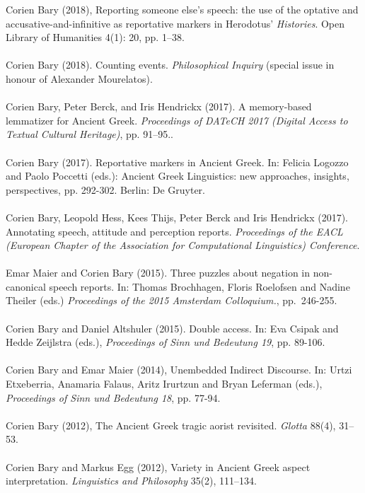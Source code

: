 \documentclass[a4paper,11pt]{article}
\begin{document}
Corien Bary (2018), Reporting someone else's speech: the use of the optative and accusative-and-infinitive as reportative markers in Herodotus' \emph{Histories}. Open Library of Humanities 4(1): 20, pp. 1--38.\\\\
Corien Bary (2018). Counting events. \emph{Philosophical Inquiry} (special issue in honour of Alexander Mourelatos).\\\\
Corien Bary, Peter Berck, and Iris Hendrickx (2017). A memory-based lemmatizer for Ancient Greek. \emph{Proceedings of DATeCH 2017 (Digital Access to Textual Cultural Heritage)}, pp. 91--95..\\\\
Corien Bary (2017). Reportative markers in Ancient Greek. In: Felicia Logozzo and Paolo Poccetti (eds.): Ancient Greek Linguistics: new approaches, insights, perspectives, pp. 292-302. Berlin: De Gruyter.\\\\
Corien Bary, Leopold Hess, Kees Thijs, Peter Berck and Iris Hendrickx (2017). Annotating speech, attitude and perception reports. \emph{Proceedings of the EACL  (European Chapter of the Association for Computational Linguistics) Conference}.\\\\
Emar Maier and Corien Bary (2015). Three puzzles about negation in non-canonical speech reports. In: Thomas Brochhagen, Floris Roelofsen and Nadine Theiler (eds.) \emph{Proceedings of the 2015 Amsterdam Colloquium.}, pp.\ 246-255.\\\\
Corien Bary and Daniel Altshuler (2015). Double access. In: Eva Csipak and Hedde Zeijlstra (eds.), \emph{Proceedings of Sinn und Bedeutung 19}, pp. 89-106.\\\\
Corien Bary and Emar Maier (2014), Unembedded Indirect Discourse. In: Urtzi Etxeberria, Anamaria Falaus, Aritz Irurtzun and Bryan Leferman (eds.), \emph{Proceedings of Sinn und Bedeutung 18}, pp. 77-94.\\\\
Corien Bary (2012), The Ancient Greek tragic aorist revisited. \emph{Glotta} 88(4), 31--53.\\\\
Corien Bary and Markus Egg (2012), Variety in Ancient Greek aspect interpretation. \emph{Linguistics and Philosophy} 35(2), 111--134.\\\\
\end{document}

